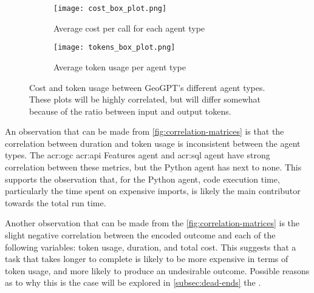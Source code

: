 \begin{figure}[htbp]
    \centering
    \begin{subfigure}[b]{0.48\textwidth}
        \centering
        \texttt{[image: cost\_box\_plot.png]}
        \caption{Average cost per call for each agent type}
        \label{fig:cost-box-plot}
    \end{subfigure}
    \hfill
    \begin{subfigure}[b]{0.48\textwidth}
        \centering
        \texttt{[image: tokens\_box\_plot.png]}
        \caption{Average token usage per agent type}
        \label{fig:tokens-box-plot}
    \end{subfigure}
    \caption[Cost and token usage between GeoGPT's different agent types]{Cost and token usage between GeoGPT's different agent types. These plots will be highly correlated, but will differ somewhat because of the ratio between input and output tokens.}
    \label{fig:cost-and-tokens}
\end{figure}

An observation that can be made from \autoref{fig:correlation-matrices} is that the correlation between duration and token usage is inconsistent between the agent types. The \acrshort{acr:ogc} \acrshort{acr:api} Features agent and \acrshort{acr:sql} agent have strong correlation between these metrics, but the Python agent has next to none. This supports the observation that, for the Python agent, code execution time, particularly the time spent on expensive imports, is likely the main contributor towards the total run time.

Another observation that can be made from the \autoref{fig:correlation-matrices} is the slight negative correlation between the encoded outcome and each of the following variables: token usage, duration, and total cost. This suggests that a task that takes longer to complete is likely to be more expensive in terms of token usage, and more likely to produce an undesirable outcome. Possible reasons as to why this is the case will be explored in \autoref{subsec:dead-ends} the .

